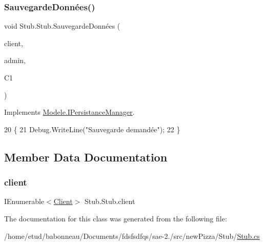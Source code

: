 \subsubsection{\texorpdfstring{Sauvegarde\+Données()}{SauvegardeDonnées()}}
{\footnotesize\ttfamily void Stub.\+Stub.\+Sauvegarde\+Données (\begin{DoxyParamCaption}\item[{I\+Enumerable$<$ \hyperlink{classModele_1_1Client}{Client} $>$}]{client,  }\item[{I\+Enumerable$<$ \hyperlink{classModele_1_1Administrateur}{Administrateur} $>$}]{admin,  }\item[{\hyperlink{classModele_1_1Catalogue}{Catalogue}}]{C1 }\end{DoxyParamCaption})\hspace{0.3cm}{\ttfamily [inline]}}



Implements \hyperlink{interfaceModele_1_1IPersistanceManager_a1b1fcf75cf99ef247ad7f83b1e816ea4}{Modele.\+I\+Persistance\+Manager}.


\begin{DoxyCode}
20         \{
21             Debug.WriteLine(\textcolor{stringliteral}{"Sauvegarde demandée"});
22         \}
\end{DoxyCode}


\subsection{Member Data Documentation}
\mbox{\label{classStub_1_1Stub_a2035b814ba0e82a3e4d514a334253c3f}} 
\subsubsection{\texorpdfstring{client}{client}}
{\footnotesize\ttfamily I\+Enumerable$<$\hyperlink{classModele_1_1Client}{Client}$>$ Stub.\+Stub.\+client}



The documentation for this class was generated from the following file\+:\begin{DoxyCompactItemize}
\item 
/home/etud/babonneau/\+Documents/fdsfsdfqs/sae-\/2./src/new\+Pizza/\+Stub/\hyperlink{Stub_8cs}{Stub.\+cs}\end{DoxyCompactItemize}
